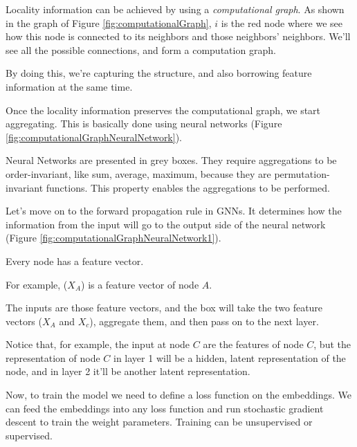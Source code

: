 Locality information can be achieved by using a \textit{computational graph}. As shown in the graph of Figure \ref{fig:computationalGraph}, $i$ is the red node where we see how this node is connected to its neighbors and those neighbors’ neighbors. We’ll see all the possible connections, and form a computation graph. \newline

By doing this, we’re capturing the structure, and also borrowing feature information at the same time. \newline

Once the locality information preserves the computational graph, we start aggregating. This is basically done using neural networks (Figure \ref{fig:computationalGraphNeuralNetwork}). \newline

Neural Networks are presented in grey boxes. They require aggregations to be order-invariant, like sum, average, maximum, because they are permutation-invariant functions. This property enables the aggregations to be performed. \newline

Let’s move on to the forward propagation rule in GNNs. It determines how the information from the input will go to the output side of the neural network (Figure \ref{fig:computationalGraphNeuralNetwork1}). \newline

Every node has a feature vector. \newline

For example, ($X_A$) is a feature vector of node $A$. \newline

The inputs are those feature vectors, and the box will take the two feature vectors ($X_A$ and $X_c$), aggregate them, and then pass on to the next layer. \newline

Notice that, for example, the input at node $C$ are the features of node $C$, but the representation of node $C$ in layer 1 will be a hidden, latent representation of the node, and in layer 2 it’ll be another latent representation. \newline

Now, to train the model we need to define a loss function on the embeddings. We can feed the embeddings into any loss function and run stochastic gradient descent to train the weight parameters. Training can be unsupervised or supervised.

